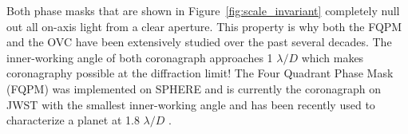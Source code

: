 \documentclass[letterpaper]{ar-1col}
\begin{document}
Both phase masks that are shown in Figure~\ref{fig:scale_invariant} completely null out all on-axis light from a clear aperture.
%
This property is why both the FQPM and the OVC have been extensively studied over the past several decades.
%
The inner-working angle of both coronagraph approaches 1 $\lambda/D$ which makes coronagraphy possible at the diffraction limit!
%
The Four Quadrant Phase Mask (FQPM) was implemented on SPHERE \citep{Boccaletti04} and is currently the coronagraph on JWST with the smallest inner-working angle and has been recently used to characterize a planet at 1.8 $\lambda/D$ \citep{franson2024jwst}. 
 
%

%
%
%


\end{document}
